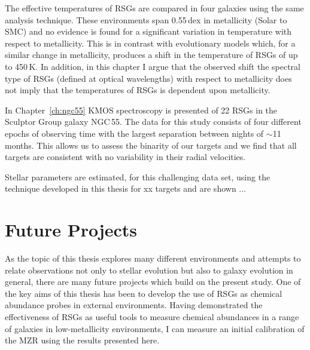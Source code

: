 The effective temperatures of RSGs are compared in four galaxies using the same analysis technique.
These environments span 0.55\,dex in metallicity (Solar to SMC) and no evidence is found for a significant variation in temperature with respect to metallicity.
This is in contrast with evolutionary models which, for a  similar change in metallicity, produces a shift in the temperature of RSGs of up to 450\,K.
In addition, in this chapter I argue that the observed shift the spectral type of RSGs (defined at optical wavelengths) with respect to metallicity does not imply that the temperatures of RSGs is dependent upon metallicity.


In Chapter~\ref{ch:ngc55} KMOS spectroscopy is presented of 22 RSGs in the Sculptor Group galaxy NGC\,55.
The data for this study consists of four different epochs of observing time with the largest separation between nights of $\sim$11 months.
This allows us to assess the binarity of our targets and we find that all targets are consistent with no variability in their radial velocities.

Stellar parameters are estimated, for this challenging data set, using the technique developed in this thesis for xx targets and are shown ...



\section{Future Projects} %
\label{sec:future_projects}

As the topic of this thesis explores many different environments and attempts to relate observations not only to stellar evolution but also to galaxy evolution in general, there are many future projects which build on the present study.
One of the key aims of this thesis has been to develop the use of RSGs as chemical abundance probes in external environments.
Having demonstrated the effectiveness of RSGs as useful tools to measure chemical abundances in a range of galaxies in low-metallicity environments, I can measure an initial calibration of the MZR using the results presented here.


